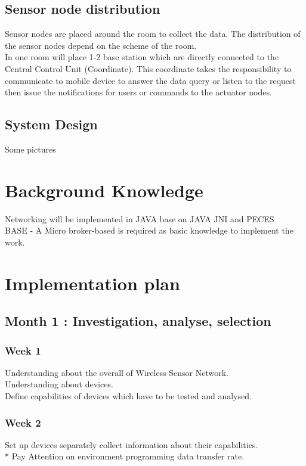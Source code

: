 \documentclass[a4paper, 12pt]{article}
\begin{document}
\subsection{Sensor node distribution}
Sensor nodes are placed around the room to collect the data. The distribution of the sensor nodes depend on the scheme of the room. \\
In one room will place 1-2 base station which are directly connected to the Central Control Unit (Coordinate). This coordinate takes the responsibility to communicate to mobile device to answer the data query or listen to the request then issue the notifications for users or commands to the actuator nodes.
\subsection{System Design}
Some pictures
\section{Background Knowledge}
Networking will be implemented in JAVA base on JAVA JNI and PECES\\
BASE - A Micro broker-based is required as basic knowledge to implement the work.
\section{Implementation plan}
\subsection{Month 1 : Investigation, analyse, selection}
\subsubsection{Week 1}
Understanding about the overall of Wireless Sensor Network.\\
Understanding about devices.\\
Define capabilities of devices which have to be tested and analysed.
\subsubsection{Week 2}
Set up devices separately collect information about their capabilities.\\
* Pay Attention on environment programming data transfer rate.
\end{document}
